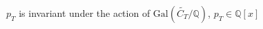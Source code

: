 \documentclass[preview]{standalone}
\begin{document}
\begin{center}
$p_T$ is invariant under the action of $\text{Gal}\left(\widetilde{C_T}/\mathbb{Q}\right)$, $p_T \in \mathbb{Q}[x]$
\end{center}
\end{document}
